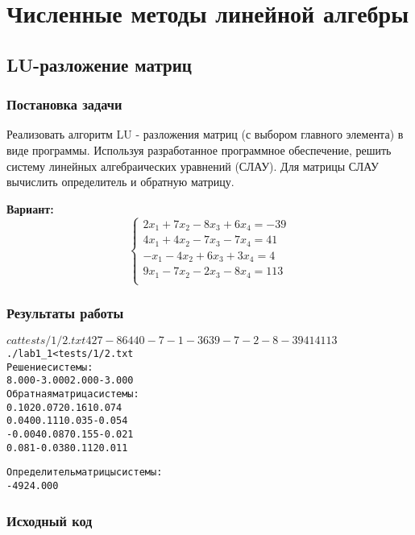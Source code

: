 \section{Численные методы линейной алгебры}

\subsection{LU-разложение матриц}

\subsubsection{Постановка задачи}
Реализовать алгоритм LU - разложения матриц (с выбором главного элемента) в виде программы. Используя разработанное программное обеспечение, решить систему линейных алгебраических уравнений (СЛАУ). Для матрицы СЛАУ вычислить определитель и обратную матрицу.

{\bfseries Вариант:}
\begin{equation*}
\begin{cases}
2x_1 + 7x_2 - 8x_3 + 6x_4 = -39\\
4x_1 + 4x_2 - 7x_3 - 7x_4 = 41\\
-x_1 - 4x_2 + 6x_3 + 3x_4 = 4\\
9x_1 - 7x_2 - 2x_3 - 8x_4 = 113\\
\end{cases}
\end{equation*}

\subsubsection{Результаты работы}
\begin{alltt}
$ cat tests/1/2.txt
4
2 7 -8 6
4 4 0 -7
-1 -3 6 3
9 -7 -2 -8
-39 41 4 113

$ ./lab1_1 < tests/1/2.txt
Решение системы:
   8.000   -3.000    2.000   -3.000
Обратная матрица системы:
   0.102    0.072    0.161    0.074
   0.040    0.111    0.035   -0.054
  -0.004    0.087    0.155   -0.021
   0.081   -0.038    0.112    0.011

Определитель матрицы системы:
-4924.000
\end{alltt}
\pagebreak

\subsubsection{Исходный код}

\pagebreak

